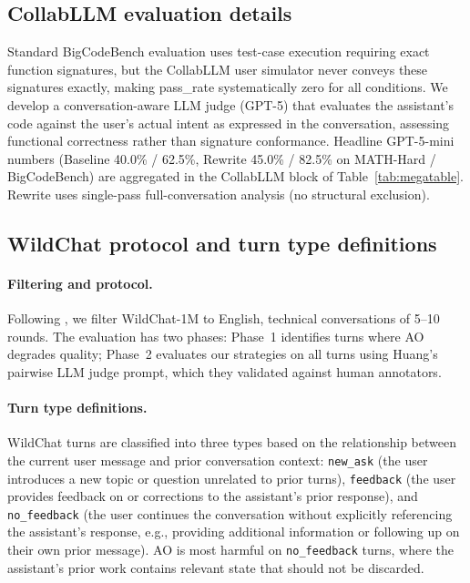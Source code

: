 \documentclass{article}
\begin{document}
\subsection{CollabLLM evaluation details}
\label{app:collabllm}

Standard BigCodeBench evaluation uses test-case execution requiring exact function signatures, but the CollabLLM user simulator never conveys these signatures exactly, making pass\_rate systematically zero for all conditions. We develop a conversation-aware LLM judge (GPT-5) that evaluates the assistant's code against the user's actual intent as expressed in the conversation, assessing functional correctness rather than signature conformance. Headline GPT-5-mini numbers (Baseline 40.0\% / 62.5\%, Rewrite 45.0\% / 82.5\% on MATH-Hard / BigCodeBench) are aggregated in the CollabLLM block of Table~\ref{tab:megatable}. Rewrite uses single-pass full-conversation analysis (no structural exclusion).

\subsection{WildChat protocol and turn type definitions}
\label{app:wildchat-turns}

\paragraph{Filtering and protocol.} Following \citet{huang2026context}, we filter WildChat-1M to English, technical conversations of 5--10 rounds. The evaluation has two phases: Phase~1 identifies turns where AO degrades quality; Phase~2 evaluates our strategies on all turns using Huang's pairwise LLM judge prompt, which they validated against human annotators.

\paragraph{Turn type definitions.} WildChat turns are classified into three types based on the relationship between the current user message and prior conversation context: \texttt{new\_ask} (the user introduces a new topic or question unrelated to prior turns), \texttt{feedback} (the user provides feedback on or corrections to the assistant's prior response), and \texttt{no\_feedback} (the user continues the conversation without explicitly referencing the assistant's response, e.g., providing additional information or following up on their own prior message). AO is most harmful on \texttt{no\_feedback} turns, where the assistant's prior work contains relevant state that should not be discarded.
\end{document}

